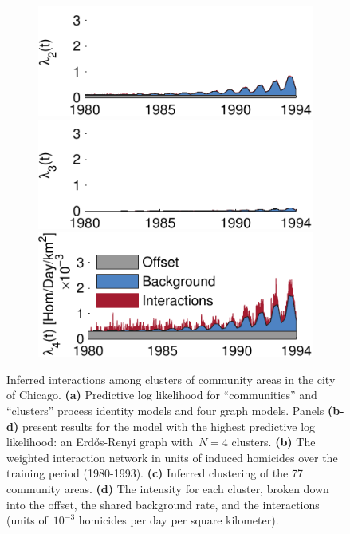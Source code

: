 \begin{figure}[!t]
\begin{center}
\begin{subfigure}[B]{.28\textwidth}
      \includegraphics[width=\linewidth]{figures/ch2/icpsr_rate2} \\ 
      \includegraphics[width=\linewidth]{figures/ch2/icpsr_rate3} \\
      \includegraphics[width=\linewidth]{figures/ch2/icpsr_rate4} 
      \label{fig:chicago_rates}
    \end{subfigure}
  \end{center}
\vspace{-1em}
\caption[Inferred gang interactions in the city of Chicago]{
  Inferred interactions among clusters of community areas in the city of Chicago.
  \textbf{(a)} Predictive log likelihood for ``communities'' and ``clusters''  process identity models and four graph models. 
  Panels \textbf{(b-d)} present results for the model with the highest predictive log likelihood: an Erd\H{o}s-Renyi graph with~${N=4}$ clusters.
  \textbf{(b)} The weighted interaction network in units of induced homicides over the training period (1980-1993).
  \textbf{(c)} Inferred clustering of the 77 community areas.
  \textbf{(d)} The intensity for each cluster, broken down into the offset, the shared background rate, and the interactions (units of~${10^{-3}}$ homicides per day per square kilometer).}
\label{fig:chicago}
\end{figure}


